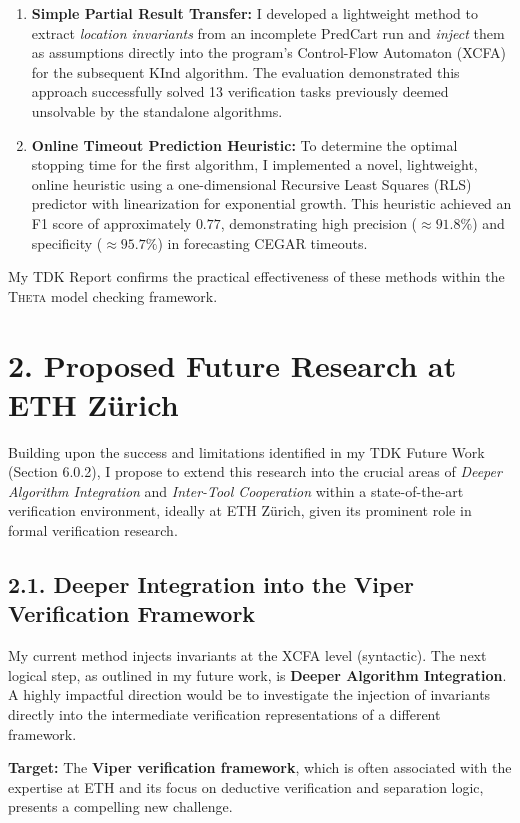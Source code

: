 \documentclass[11pt, a4paper]{article}
\begin{document}
\begin{enumerate}
    \item \textbf{Simple Partial Result Transfer:} I developed a lightweight method to extract \textit{location invariants} from an incomplete PredCart run and \textit{inject} them as assumptions directly into the program's Control-Flow Automaton (XCFA) for the subsequent KInd algorithm. The evaluation demonstrated this approach successfully solved 13 verification tasks previously deemed unsolvable by the standalone algorithms.
    \item \textbf{Online Timeout Prediction Heuristic:} To determine the optimal stopping time for the first algorithm, I implemented a novel, lightweight, online heuristic using a one-dimensional Recursive Least Squares (RLS) predictor with linearization for exponential growth. This heuristic achieved an F1 score of approximately $0.77$, demonstrating high precision ($\approx 91.8\%$) and specificity ($\approx 95.7\%$) in forecasting CEGAR timeouts.
\end{enumerate}

My TDK Report confirms the practical effectiveness of these methods within the \textsc{Theta} model checking framework.

\section*{2. Proposed Future Research at ETH Zürich}

Building upon the success and limitations identified in my TDK Future Work (Section 6.0.2), I propose to extend this research into the crucial areas of \textit{Deeper Algorithm Integration} and \textit{Inter-Tool Cooperation} within a state-of-the-art verification environment, ideally at ETH Zürich, given its prominent role in formal verification research.

\subsection*{2.1. Deeper Integration into the Viper Verification Framework}

My current method injects invariants at the XCFA level (syntactic). The next logical step, as outlined in my future work, is \textbf{Deeper Algorithm Integration}. A highly impactful direction would be to investigate the injection of invariants directly into the intermediate verification representations of a different framework.

\textbf{Target:} The \textbf{Viper verification framework}, which is often associated with the expertise at ETH and its focus on deductive verification and separation logic, presents a compelling new challenge.
\end{document}

